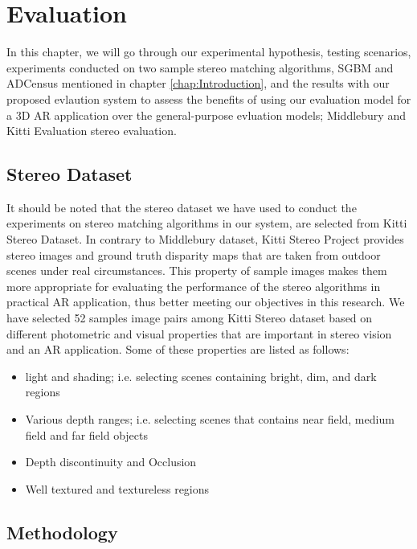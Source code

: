 \chapter{Evaluation}
\label{chap:Evaluation}

In this chapter, we will go through our experimental hypothesis, testing scenarios, experiments conducted on two sample 
stereo matching algorithms, SGBM and ADCensus mentioned in chapter \ref{chap:Introduction}, and the results with our
proposed evlaution system to assess the benefits of using our evaluation model for a 3D AR application over the general-purpose evluation models; 
Middlebury and Kitti Evaluation stereo evaluation.

\section{Stereo Dataset}
It should be noted that the stereo dataset we have used to conduct the experiments on stereo matching algorithms in our system,
are selected from Kitti Stereo Dataset.
In contrary to Middlebury dataset, Kitti Stereo Project provides stereo images and ground truth disparity maps
that are taken from outdoor scenes under real circumstances. This property of sample images makes them more appropriate 
for evaluating the performance of the stereo algorithms in practical AR application, thus better meeting our objectives in this research.
We have selected 52 samples image pairs among Kitti Stereo dataset based on different photometric and visual properties that are important
in stereo vision and an AR application. Some 
of these properties are listed as follows:
\begin{itemize}
\item light and shading; i.e. selecting scenes containing bright, dim, and dark regions
\item Various depth ranges; i.e. selecting scenes that contains near field, medium field and far field objects  
\item Depth discontinuity and Occlusion
\item Well textured and textureless regions
\end{itemize}


\section{Methodology}

